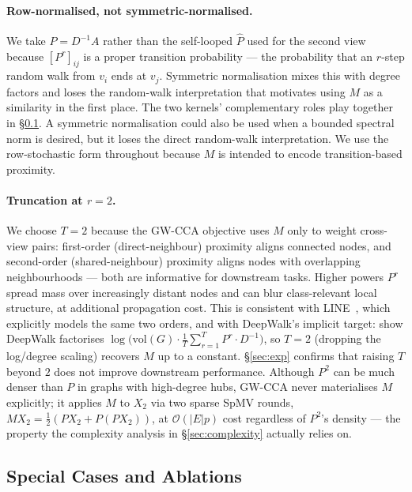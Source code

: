 \documentclass{article}
\begin{document}
\paragraph{Row-normalised, not symmetric-normalised.}
We take $P = D^{-1}A$ rather than the self-looped $\widehat{P}$ used for
the second view because $[P^r]_{ij}$ is a proper transition probability --- the
probability that an $r$-step random walk from $v_i$ ends at $v_j$. Symmetric
normalisation mixes this with degree factors and loses the random-walk
interpretation that motivates using $M$ as a similarity in the first place.
The two kernels' complementary roles play together in
\S\ref{sec:apply:special}. A symmetric normalisation could also be used
when a bounded spectral norm is desired, but it loses the direct
random-walk interpretation. We use the row-stochastic form throughout
because $M$ is intended to encode transition-based proximity.

\paragraph{Truncation at $r = 2$.}
We choose $T = 2$ because the GW-CCA objective uses $M$ only to weight
cross-view pairs: first-order (direct-neighbour) proximity aligns
connected nodes, and second-order (shared-neighbour) proximity aligns
nodes with overlapping neighbourhoods --- both are informative for
downstream tasks. Higher powers $P^r$ spread mass over increasingly
distant nodes and can blur class-relevant local structure, at additional
propagation cost. This is consistent with LINE~\citep{tang2015line},
which explicitly models the same two orders, and with DeepWalk's implicit
target: \citet{qiu2018network} show DeepWalk factorises
$\log\!\big(\mathrm{vol}(G) \cdot \tfrac{1}{T}\sum_{r=1}^{T} P^r \cdot D^{-1}\big)$,
so $T = 2$ (dropping the log/degree scaling) recovers $M$ up to a
constant. \S\ref{sec:exp} confirms that raising $T$ beyond $2$ does not
improve downstream performance. Although $P^2$ can be much denser than
$P$ in graphs with high-degree hubs, GW-CCA never materialises $M$
explicitly; it applies $M$ to $X_2$ via two sparse SpMV rounds,
$M X_2 = \tfrac{1}{2}(P X_2 + P(P X_2))$, at $\mathcal{O}(|E| p)$ cost
regardless of $P^2$'s density --- the property the complexity analysis in
\S\ref{sec:complexity} actually relies on.

\subsection{Special Cases and Ablations}
\label{sec:apply:special}
\end{document}
